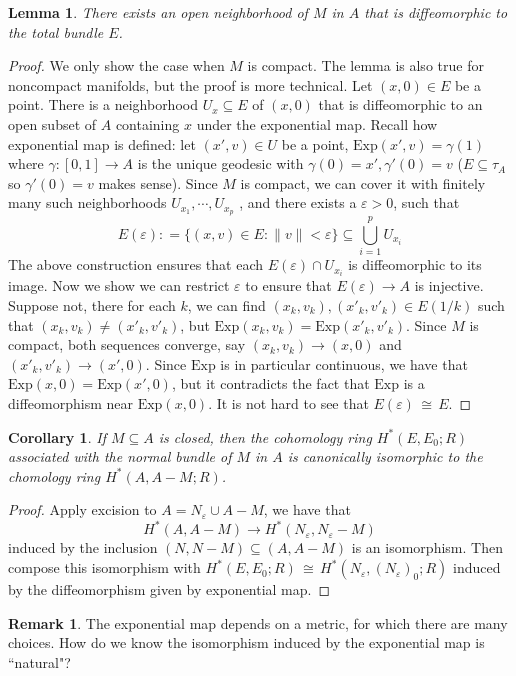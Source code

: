 \documentclass[12pt]{article}
\theoremstyle{plain}
\newtheorem{corollary}[equation]{Corollary}
\newtheorem{lemma}[equation]{Lemma}
\theoremstyle{definition}
\newtheorem{remark}[equation]{Remark}
\newcommand\iso{\,{\cong}\,}
\newcommand\union{\bigcup}
\newcommand{\<}{\langle}
\renewcommand{\>}{\rangle}
\newcommand{\Exp}{\mathrm{Exp}}
\newcommand{\sm}{\varepsilon}
\begin{document}
\begin{lemma}
There exists an open neighborhood of $M$ in $A$ that is diffeomorphic to the total bundle $E$. 
\end{lemma}
\begin{proof}
We only show the case when $M$ is compact. The lemma is also true for noncompact manifolds, but the proof is more technical. Let $(x, 0) \in E$ be a point. There is a neighborhood $U_x \subseteq E$ of $(x, 0)$ that is diffeomorphic to an open subset of $A$ containing $x$ under the exponential map. Recall how exponential map is defined: let $(x', v) \in U$ be a point, $\Exp(x', v) = \gamma(1)$ where $\gamma : [0, 1] \to A$ is the unique geodesic with $\gamma(0) = x', \gamma'(0) = v$ ($E \subseteq \tau_A$ so $\gamma'(0) = v$ makes sense). Since $M$ is compact, we can cover it with finitely many such neighborhoods $U_{x_1}, \cdots, U_{x_p}$ , and there exists a $\sm >0 $, such that 
$$ E(\sm) : = \{(x, v) \in E : \| v\| < \sm \} \subseteq \union_{i = 1}^p U_{x_i}$$ 
The above construction ensures that each $E(\sm) \cap U_{x_i}$ is diffeomorphic to its image. Now we show we can restrict $\sm$ to ensure that $E(\sm) \to A$ is injective. Suppose not, there for each $k$, we can find $(x_k, v_k), (x'_k, v'_k) \in E(1/k)$ such that $(x_k, v_k) \neq (x'_k, v'_k)$, but $\Exp(x_k, v_k) = \Exp(x'_k, v'_k)$. Since $M$ is compact, both sequences converge, say $(x_k, v_k) \to (x, 0)$ and $(x'_k, v'_k) \to (x', 0)$. Since $\Exp$ is in particular continuous, we have that $\Exp(x, 0) = \Exp(x', 0)$, but it contradicts the fact that $\Exp$ is a diffeomorphism near $\Exp(x, 0)$. It is not hard to see that $E(\sm) \iso E$. 
\end{proof}
\begin{corollary}
If $M \subseteq A$ is closed, then the cohomology ring $H^*(E, E_0; R)$ associated with the normal bundle of $M$ in $A$ is canonically isomorphic to the chomology ring $H^*(A, A-M; R)$.
\end{corollary}
\begin{proof}
Apply excision to $A = N_\sm \cup A - M$, we have that 
$$ H^*(A, A-M) \to H^*(N_\sm, N_\sm - M)$$ induced by the inclusion $(N, N - M) \subseteq (A, A-M)$ is an isomorphism. Then compose this isomorphism with $H^*(E, E_0; R) \iso H^*(N_\sm, (N_\sm)_0; R)$ induced by the diffeomorphism given by exponential map. 
\end{proof}
\begin{remark}
The exponential map depends on a metric, for which there are many choices. How do we know the isomorphism induced by the exponential map is ``natural"?
\end{remark}
\end{document}
